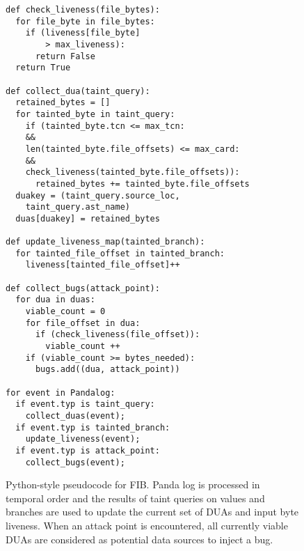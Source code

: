 \begin{figure}[t]
\begin{lstlisting}
def check_liveness(file_bytes):
  for file_byte in file_bytes:
    if (liveness[file_byte] 
        > max_liveness):
      return False
  return True

def collect_dua(taint_query):
  retained_bytes = []
  for tainted_byte in taint_query:
    if (tainted_byte.tcn <= max_tcn:
    && 
    len(tainted_byte.file_offsets) <= max_card:
    && 
    check_liveness(tainted_byte.file_offsets)):
      retained_bytes += tainted_byte.file_offsets
  duakey = (taint_query.source_loc, 
    taint_query.ast_name)
  duas[duakey] = retained_bytes

def update_liveness_map(tainted_branch):
  for tainted_file_offset in tainted_branch:
    liveness[tainted_file_offset]++

def collect_bugs(attack_point):
  for dua in duas:
    viable_count = 0
    for file_offset in dua:
      if (check_liveness(file_offset)):
        viable_count ++
    if (viable_count >= bytes_needed):
      bugs.add((dua, attack_point))

for event in Pandalog:
  if event.typ is taint_query:
    collect_duas(event);
  if event.typ is tainted_branch: 
    update_liveness(event);
  if event.typ is attack_point: 
    collect_bugs(event);
\end{lstlisting}
\caption{Python-style pseudocode for FIB. 
Panda log is processed in temporal order and the results of taint queries on values and branches are 
used to update the current set of DUAs and input byte liveness.
When an attack point is encountered, all currently viable DUAs are considered as potential data sources to inject a bug.}
\end{figure}


